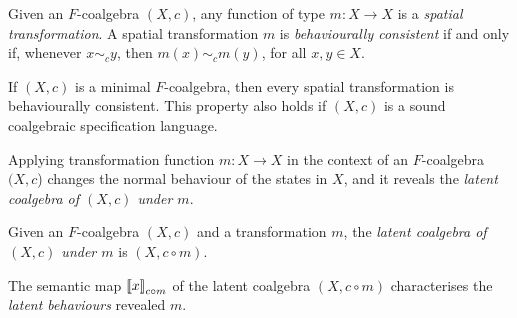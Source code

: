 \begin{definition}
Given an $F$-coalgebra $(X,c)$, any function of type $m\colon X\rightarrow X$ is a \emph{spatial transformation}. %
A spatial transformation $m$ is \emph{behaviourally consistent} if and only if, whenever $x\sim_c y$, then $m(x)\sim_{c} m(y)$, for all $x,y \in X$. %
\end{definition}
\begin{corollary}
    If $(X,c)$ is a minimal $F$-coalgebra, then every spatial transformation %
    is behaviourally consistent. This property also holds if $(X,c)$ is a sound coalgebraic specification language.
\end{corollary}
Applying transformation function $m\colon X\rightarrow X$ in the context of an $F$-coalgebra $(X,c$) changes the normal behaviour of the states in $X$, and it reveals the \emph{latent coalgebra of $(X,c)$ under $m$}. 
\begin{definition}
Given an $F$-coalgebra $(X,c)$ and a transformation $m$, the \emph{latent coalgebra of $(X,c)$ under $m$} is $(X,c\circ m)$. 
\end{definition}
The semantic map ${{\llbracket x\rrbracket}}_{{c\circ m}}$ of the latent coalgebra $(X,c\circ m)$ characterises the \emph{latent behaviours} revealed $m$. 

